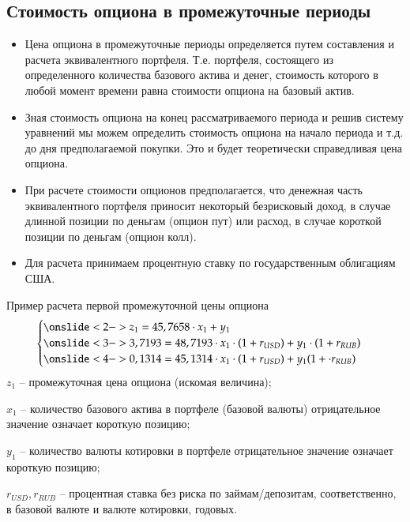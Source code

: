 \documentclass[financial_risks_lectures.tex]{subfiles}
\begin{document}
\subsection{Стоимость опциона в промежуточные периоды}
\begin{frame}{}
\begin{itemize}[<+->]
\item
Цена опциона в промежуточные периоды определяется путем составления и расчета эквивалентного портфеля. Т.е. портфеля, состоящего из определенного количества базового актива и денег, стоимость которого в любой момент времени равна стоимости опциона на базовый актив.
\item
Зная стоимость опциона на конец рассматриваемого периода и решив систему уравнений мы можем определить стоимость опциона на начало периода и т.д. до дня предполагаемой покупки. Это и будет теоретически справедливая цена опциона.

\end{itemize}
\end{frame}
\begin{frame}{}
\begin{itemize}[<+->]
\item
При расчете стоимости опционов предполагается, что денежная часть эквивалентного портфеля приносит некоторый безрисковый доход, в случае длинной позиции по деньгам (опцион пут) или расход, в случае короткой позиции по деньгам (опцион колл). 
\item
Для расчета принимаем процентную ставку по государственным облигациям США.
\end{itemize}
\end{frame}
\begin{frame}[shrink=10]{Пример расчета первой промежуточной цены опциона}
\begin{align*}
\begin{cases} 
\onslide<2->{z_1 = 45,7658 \cdot x_1 + y_1}\\ 
\onslide<3->{3,7193 = 48,7193 \cdot x_1 \cdot (1 + r_{USD}) + y_1 \cdot (1 + r_{RUB})}\\
\onslide<4->{0,1314 = 45,1314 \cdot x_1 \cdot (1 + r_{USD}) + y_1 (1 + \cdot r_{RUB})}
\end{cases}
\end{align*}
$z_1$ – промежуточная цена опциона (искомая величина);

$x_1$ – количество базового актива в портфеле (базовой валюты) отрицательное значение означает короткую позицию;

$y_1$ – количество валюты котировки в портфеле отрицательное значение означает короткую позицию;

$r_{USD},r_{RUB}$ – процентная ставка без риска по займам/депозитам, соответственно, в базовой валюте и валюте котировки, годовых.
\end{frame}
\end{document}

